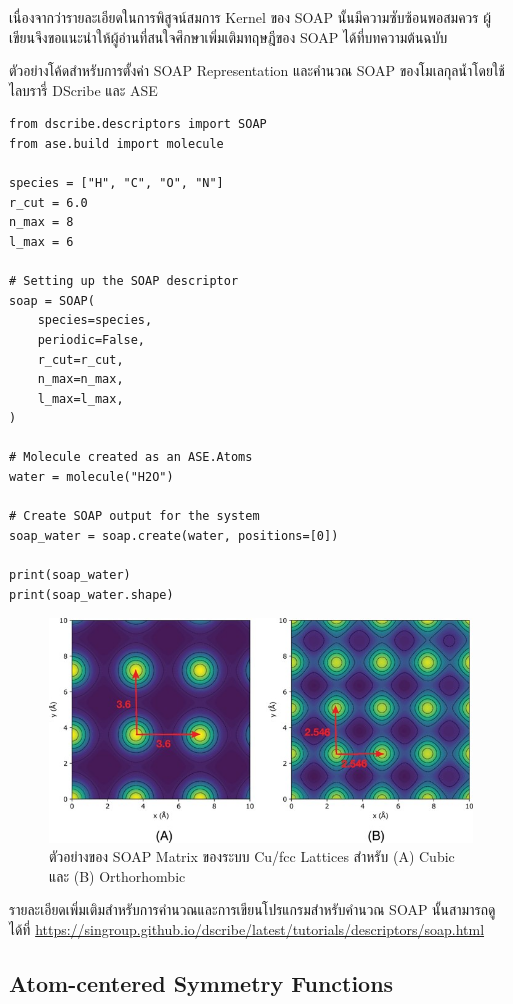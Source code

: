 เนื่องจากว่ารายละเอียดในการพิสูจน์สมการ Kernel ของ SOAP นั้นมีความซับซ้อนพอสมควร ผู้เขียนจึงขอแนะนำให้ผู้อ่านที่สนใจศึกษาเพิ่มเติมทฤษฎีของ 
SOAP ได้ที่บทความต้นฉบับ\autocite{bartok2013}

ตัวอย่างโค้ดสำหรับการตั้งค่า SOAP Representation และคำนวณ SOAP ของโมเลกุลน้ำโดยใช้ไลบรารี่ DScribe และ ASE

\begin{lstlisting}[style=MyPython]
from dscribe.descriptors import SOAP
from ase.build import molecule

species = ["H", "C", "O", "N"]
r_cut = 6.0
n_max = 8
l_max = 6

# Setting up the SOAP descriptor
soap = SOAP(
    species=species,
    periodic=False,
    r_cut=r_cut,
    n_max=n_max,
    l_max=l_max,
)

# Molecule created as an ASE.Atoms
water = molecule("H2O")

# Create SOAP output for the system
soap_water = soap.create(water, positions=[0])

print(soap_water)
print(soap_water.shape)
\end{lstlisting}

\begin{figure}[htbp]
    \centering
    \includegraphics[width=\linewidth]{fig/soap_matrix.jpg}
    \caption{ตัวอย่างของ SOAP Matrix ของระบบ Cu/fcc Lattices สำหรับ (A) Cubic และ (B) Orthorhombic}
    \label{fig:soap_matrix}
\end{figure}

รายละเอียดเพิ่มเติมสำหรับการคำนวณและการเขียนโปรแกรมสำหรับคำนวณ SOAP นั้นสามารถดูได้ที่
\url{https://singroup.github.io/dscribe/latest/tutorials/descriptors/soap.html}

\subsection{Atom-centered Symmetry Functions}
\label{ssec:acsf}


